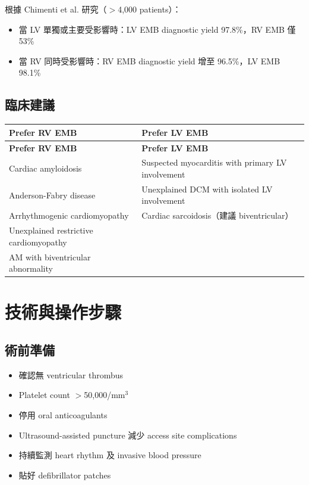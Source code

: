 \documentclass[12pt,a4paper]{article}
\begin{document}
根據 Chimenti et al. 研究（$>$4,000 patients）：
\begin{itemize}
    \item 當 LV 單獨或主要受影響時：LV EMB diagnostic yield 97.8\%，RV EMB 僅 53\%
    \item 當 RV 同時受影響時：RV EMB diagnostic yield 增至 96.5\%，LV EMB 98.1\%
\end{itemize}

\subsection{臨床建議}

\begin{longtable}{p{7cm}p{7cm}}
\toprule
\textbf{Prefer RV EMB} & \textbf{Prefer LV EMB} \\
\midrule
\endfirsthead
\toprule
\textbf{Prefer RV EMB} & \textbf{Prefer LV EMB} \\
\midrule
\endhead
Cardiac amyloidosis & Suspected myocarditis with primary LV involvement \\
\midrule
Anderson-Fabry disease & Unexplained DCM with isolated LV involvement \\
\midrule
Arrhythmogenic cardiomyopathy & Cardiac sarcoidosis（建議 biventricular） \\
\midrule
Unexplained restrictive cardiomyopathy & \\
\midrule
AM with biventricular abnormality & \\
\bottomrule
\end{longtable}

\section{技術與操作步驟}

\subsection{術前準備}

\begin{itemize}
    \item 確認無 ventricular thrombus
    \item Platelet count $>$50,000/mm$^3$
    \item 停用 oral anticoagulants
    \item Ultrasound-assisted puncture 減少 access site complications
    \item 持續監測 heart rhythm 及 invasive blood pressure
    \item 貼好 defibrillator patches
\end{itemize}
\end{document}
